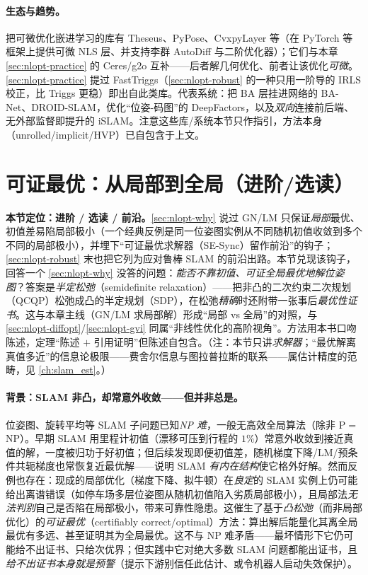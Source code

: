 \paragraph{生态与趋势。}\cite{carlone2026handbook,agarwal2012ceres}
把可微优化嵌进学习的库有 Theseus、PyPose、CvxpyLayer 等（在 PyTorch 等框架上提供可微 NLS 层、并支持李群 AutoDiff 与二阶优化器）；它们与本章 \cref{sec:nlopt-practice} 的 Ceres/g2o 互补——后者解几何优化、前者让该优化\emph{可微}。\cref{sec:nlopt-practice} 提过 FastTriggs（\cref{sec:nlopt-robust} 的一种只用一阶导的 IRLS 校正，比 Triggs 更稳）即出自此类库。代表系统：把 BA 层挂进网络的 BA-Net、DROID-SLAM，优化“位姿-码图”的 DeepFactors，以及\emph{双向}连接前后端、无外部监督即提升的 iSLAM。注意这些库/系统本节只作指引，方法本身（unrolled/implicit/HVP）已自包含于上文。

\section{可证最优：从局部到全局（进阶/选读）}
\label{sec:nlopt-certifiable}

\begin{note}
\textbf{本节定位：进阶 / 选读 / 前沿。}\;\cref{sec:nlopt-why} 说过 GN/LM 只保证\emph{局部}最优、初值差易陷局部极小（一个经典反例是同一位姿图实例从不同随机初值收敛到多个不同的局部极小），并埋下“可证最优求解器（SE-Sync）留作前沿”的钩子；\cref{sec:nlopt-robust} 末也把它列为应对鲁棒 SLAM 的前沿出路。本节兑现该钩子，回答一个 \cref{sec:nlopt-why} 没答的问题：\emph{能否不靠初值、可证全局最优地解位姿图}？答案是\emph{半定松弛}（semidefinite relaxation）——把非凸的二次约束二次规划（QCQP）松弛成凸的半定规划（SDP），在松弛\emph{精确}时还附带一张事后\emph{最优性证书}。这与本章主线（GN/LM 求局部解）形成“局部 vs 全局”的对照，与 \cref{sec:nlopt-diffopt}/\cref{sec:nlopt-gvi} 同属“非线性优化的高阶视角”。方法用本书口吻陈述，定理“陈述 $+$ 引用证明”但陈述自包含。（注：本节只讲\emph{求解器}；“最优解离真值多近”的信息论极限——费舍尔信息与图拉普拉斯的联系——属估计精度的范畴，见 \cref{ch:slam_est}。）
\end{note}

\paragraph{背景：SLAM 非凸，却常意外收敛——但并非总是。}\cite{carlone2026handbook,rosen2019sesync}
位姿图、旋转平均等 SLAM 子问题已知\emph{NP 难}，一般无高效全局算法（除非 P$=$NP）。早期 SLAM 用里程计初值（漂移可压到行程的 $1\%$）常意外收敛到接近真值的解，一度被归功于好初值；但后续发现即便初值差，随机梯度下降/LM/预条件共轭梯度也常恢复近最优解——说明 SLAM \emph{有内在结构}使它格外好解。然而反例也存在：现成的局部优化（梯度下降、拟牛顿）在\emph{良定}的 SLAM 实例上仍可能给出离谱错误（如停车场多层位姿图从随机初值陷入劣质局部极小\cite{rosen2019sesync}），且局部法\emph{无法判别}自己是否陷在局部极小，带来可靠性隐患。这催生了基于\emph{凸松弛}（而非局部优化）的\emph{可证最优}（certifiably correct/optimal）方法：算出解后能量化其离全局最优有多远、甚至证明其为全局最优。这不与 NP 难矛盾——最坏情形下它仍可能给不出证书、只给次优界；但实践中它对绝大多数 SLAM 问题都能出证书，且\emph{给不出证书本身就是预警}（提示下游别信任此估计、或令机器人启动失效保护）。

